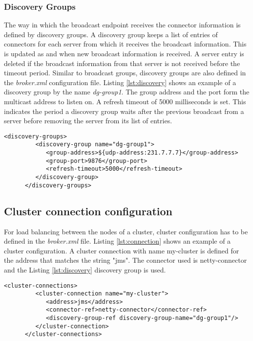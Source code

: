 \subsubsection{Discovery Groups}

The way in which the broadcast endpoint receives the connector information is defined by discovery groups. A discovery group keeps a list of entries of connectors for each server from which it receives the broadcast information. This is updated as and when new broadcast information is received. A server entry is deleted if the broadcast information from that server is not received before the timeout period. Similar to broadcast groups, discovery groups are also defined in the \textit{broker.xml} configuration file. Listing \ref{lst:discovery} shows an example of a discovery group by the name \textit{dg-group1}. The group address and the port form the multicast address to listen on. A refresh timeout of 5000 milliseconds is set. This indicates the period a discovery group waits after the previous broadcast from a server before removing the server from its list of entries.

\bigskip
\begin{lstlisting}[style=XmlInputStyle,caption=Discovery Group Example, label={lst:discovery}]
      <discovery-groups>
         <discovery-group name="dg-group1">
            <group-address>${udp-address:231.7.7.7}</group-address>
            <group-port>9876</group-port>
            <refresh-timeout>5000</refresh-timeout>
         </discovery-group>
      </discovery-groups>
\end{lstlisting}

\subsection{Cluster connection configuration}

For load balancing between the nodes of a cluster, cluster configuration has to be defined in the \textit{broker.xml} file.
Listing \ref{lst:connection} shows an example of a cluster configuration. A cluster connection with name my-cluster is defined for the address that matches the string "jms". The connector used is netty-connector and the Listing \ref{lst:discovery} discovery group is used.

\bigskip
\begin{lstlisting}[style=XmlInputStyle,caption=cluster connection configuration Example, label={lst:connection}]
      <cluster-connections>
         <cluster-connection name="my-cluster">
            <address>jms</address>
            <connector-ref>netty-connector</connector-ref>
            <discovery-group-ref discovery-group-name="dg-group1"/>
         </cluster-connection>
      </cluster-connections>
\end{lstlisting}
